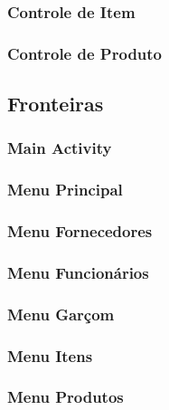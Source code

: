 \subsubsection{Controle de Item}
%
\subsubsection{Controle de Produto}


\subsection{Fronteiras}

\subsubsection{Main Activity}

\subsubsection{Menu Principal}

\subsubsection{Menu Fornecedores}

\subsubsection{Menu Funcionários}

\subsubsection{Menu Garçom}

\subsubsection{Menu Itens}

\subsubsection{Menu Produtos}

